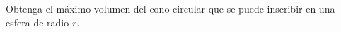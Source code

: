 \item Obtenga el máximo volumen del cono circular que se puede inscribir en una esfera de radio $r$.
